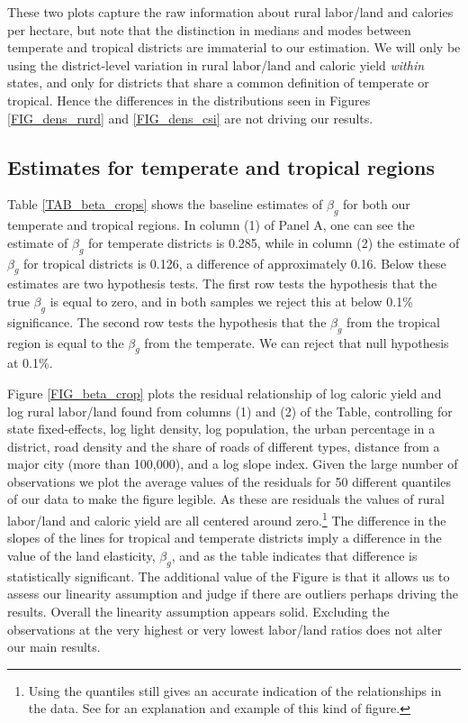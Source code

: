 \documentclass[11pt]{article}
\begin{document}
These two plots capture the raw information about rural labor/land and calories per hectare, but note that the distinction in medians and modes between temperate and tropical districts are immaterial to our estimation. We will only be using the district-level variation in rural labor/land and caloric yield \textit{within} states, and only for districts that share a common definition of temperate or tropical. Hence the differences in the distributions seen in Figures \ref{FIG_dens_rurd} and \ref{FIG_dens_csi} are not driving our results. 

\subsection{Estimates for temperate and tropical regions}
Table \ref{TAB_beta_crops} shows the baseline estimates of $\beta_g$ for both our temperate and tropical regions. In column (1) of Panel A, one can see the estimate of $\beta_g$ for temperate districts is 0.285, while in column (2) the estimate of $\beta_g$ for tropical districts is 0.126, a difference of approximately 0.16. Below these estimates are two hypothesis tests. The first row tests the hypothesis that the true $\beta_g$ is equal to zero, and in both samples we reject this at below 0.1\% significance. The second row tests the hypothesis that the $\beta_g$ from the tropical region is equal to the $\beta_g$ from the temperate. We can reject that null hypothesis at 0.1\%.

Figure \ref{FIG_beta_crop} plots the residual relationship of log caloric yield and log rural labor/land found from columns (1) and (2) of the Table, controlling for state fixed-effects, log light density, log population, the urban percentage in a district, road density and the share of roads of different types, distance from a major city (more than 100,000), and a log slope index. Given the large number of observations we plot the average values of the residuals for 50 different quantiles of our data to make the figure legible. As these are residuals the values of rural labor/land and caloric yield are all centered around zero.\footnote{Using the quantiles still gives an accurate indication of the relationships in the data. See \citet{cfs2013} for an explanation and example of this kind of figure.} The difference in the slopes of the lines for tropical and temperate districts imply a difference in the value of the land elasticity, $\beta_g$, and as the table indicates that difference is statistically significant. The additional value of the Figure is that it allows us to assess our linearity assumption and judge if there are outliers perhaps driving the results. Overall the linearity assumption appears solid. Excluding the observations at the very highest or very lowest labor/land ratios does not alter our main results.
\end{document}
